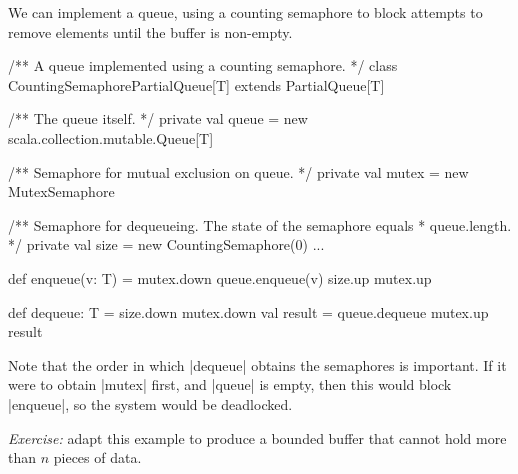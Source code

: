 \documentclass[notes,color]{sepslide0}
\begin{document}
\begin{slide}

We can implement a queue, using a counting semaphore to block attempts to
remove elements until the buffer is non-empty.

\begin{scala}
/** A queue implemented using a counting semaphore. */
class CountingSemaphorePartialQueue[T] extends PartialQueue[T]{
  /** The queue itself. */
  private val queue = new scala.collection.mutable.Queue[T]

  /** Semaphore for mutual exclusion on queue. */
  private val mutex = new MutexSemaphore

  /** Semaphore for dequeueing.  The state of the semaphore equals
    * queue.length. */
  private val size = new CountingSemaphore(0)
  ...
}
\end{scala}
\end{slide}



\begin{slide}

\begin{scala}
  def enqueue(v: T) = {
    mutex.down
    queue.enqueue(v)
    size.up
    mutex.up
  }

  def dequeue: T = {
    size.down
    mutex.down
    val result = queue.dequeue
    mutex.up
    result
  }
\end{scala}
\end{slide}




\begin{slide}

Note that the order in which |dequeue| obtains the semaphores is
important.  If it were to obtain |mutex| first, and |queue| is empty,
then this would block |enqueue|, so the system would be deadlocked. 

\emph{Exercise:} adapt this example to produce a bounded buffer that cannot
hold more than $n$ pieces of data.
\end{slide}


\end{document}
